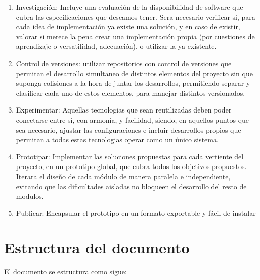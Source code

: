 \begin{enumerate}
  \item Investigación: Incluye una evaluación de la disponibilidad de software que cubra las especificaciones que deseamos tener. Sera necesario verificar si, para cada idea de implementación ya existe una solución, y en caso de existir, valorar si merece la pena crear una implementación propia (por cuestiones de aprendizaje o versatilidad, adecuación), o utilizar la ya existente.

  \item Control de versiones: utilizar repositorios con control de versiones que permitan el desarrollo simultaneo de distintos elementos del proyecto sin que suponga colisiones a la hora de juntar los desarrollos, permitiendo separar y clasificar cada uno de estos elementos, para manejar distintos versionados.

  \item Experimentar: Aquellas tecnologias que sean reutilizadas deben poder conectarse entre sí, con armonía, y facilidad, siendo, en aquellos puntos que sea necesario, ajustar las configuraciones e incluir desarrollos propios que permitan a todas estas tecnologias operar como un único sistema.

  \item Prototipar: Implementar las soluciones propuestas para cada vertiente del proyecto, en un prototipo global, que cubra todos los objetivos propuestos. Iterara el diseño de cada módulo de manera paralela e independiente, evitando que las dificultades aisladas no bloqueen el desarrollo del resto de modulos.

  \item Publicar: Encapsular el prototipo en un formato exportable y fácil de instalar
\end{enumerate}

\section{Estructura del documento}
\label{ch:Capitulo1.4}

El documento se estructura como sigue:

